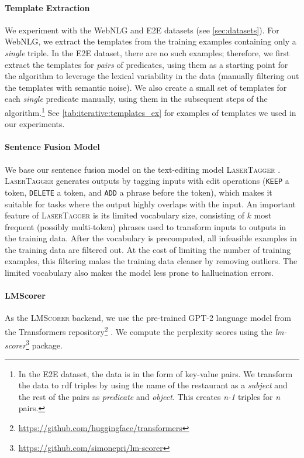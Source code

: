 \paragraph{Template Extraction} We experiment with the WebNLG and E2E datasets (see \autoref{sec:datasets}). For WebNLG, we extract the templates from the training examples containing only a \textit{single} triple. In the E2E dataset, there are no such examples; therefore, we first extract the templates for \textit{pairs} of predicates, using them as a starting point for the algorithm to leverage the lexical variability in the data (manually filtering out the templates with semantic noise). We also create a small set of templates for each \textit{single} predicate manually, using them in the subsequent steps of the algorithm.\footnote{In the E2E dataset, the data is in the form of key-value pairs. We transform the data to \ac{rdf} triples by using the name of the restaurant as a \textit{subject} and the rest of the pairs as \textit{predicate} and \textit{object}. This creates \textit{n-1} triples for \textit{n} pairs.} See \autoref{tab:iterative:templates_ex} for examples of templates we used in our experiments.

\paragraph{Sentence Fusion Model} We base our sentence fusion model on the text-editing model \textsc{LaserTagger} \cite{malmi2019lasertagger}. \textsc{LaserTagger} generates outputs by tagging inputs with edit operations (\texttt{KEEP} a token, \texttt{DELETE} a token, and \texttt{ADD} a phrase before the token), which makes it suitable for tasks where the output highly overlaps with the input. An important feature of \textsc{LaserTagger} is its limited vocabulary size, consisting of $k$ most frequent (possibly multi-token) phrases used to transform inputs to outputs in the training data. After the vocabulary is precomputed, all infeasible examples in the training data are filtered out. At the cost of limiting the number of training examples, this filtering makes the training data cleaner by removing outliers. The limited vocabulary also makes the model less prone to hallucination errors.

\paragraph{LMScorer} As the \textsc{LMScorer} backend, we use the pre-trained GPT-2 language model \citep{radford2019language} from the Transformers repository\footnote{\url{https://github.com/huggingface/transformers}} \citep{wolf2019HuggingFacesTS}. We compute the perplexity scores using the \textit{lm-scorer}\footnote{\url{https://github.com/simonepri/lm-scorer}} package.








